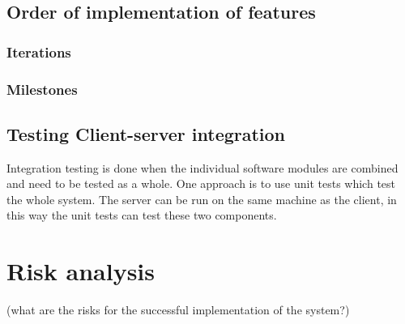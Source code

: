 \documentclass[a4paper]{article}
\begin{document}
\subsection{Order of implementation of features}

\subsubsection{Iterations}

\subsubsection{Milestones}




\subsection{Testing Client-server integration}
Integration testing is done when the individual software modules are combined and need to be tested as a whole. One approach is to use unit tests which test the whole system. The server can be run on the same machine as the client, in this way the unit tests can test these two components.

\section{Risk analysis}
(what are the risks for the successful implementation of the system?)
\end{document}
